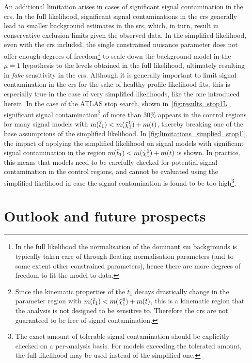 An additional limitation arises in cases of significant signal contamination in the \glspl{cr}. In the full likelihood, significant signal contaminations in the \glspl{cr} generally lead to smaller background estimates in the \glspl{sr}, which, in turn, result in conservative exclusion limits given the observed data.
In the simplified likelihood, even with the \glspl{cr} included, the single constrained nuisance parameter does not offer enough degrees of freedom\footnote{In the full likelihood the normalisation of the dominant \gls{sm} backgrounds is typically taken care of through floating normalisation parameters (and to some extent other constrained parameters), hence there are more degrees of freedom to fit the model to data.} to scale down the background model in the $\mu = 1$ hypothesis to the levels obtained in the full likelihood, ultimately resulting in \textit{fake} sensitivity in the \glspl{cr}.
Although it is generally important to limit signal contamination in the \glspl{cr} for the sake of healthy profile likelihood fits, this is especially true in the case of very simplified likelihoods, like the one introduced herein.
In the case of the ATLAS stop search, shown in~\cref{fig:results_stop1L}, significant signal contamination\footnote{Since the kinematic properties of the $\tilde{t}_1$ decays drastically change in the parameter region with $m(\tilde{t}_1) < m(\tilde{\chi}_1^0)+m(t)$, this is a kinematic region that the analysis is not designed to be sensitive to. Therefore the \glspl{cr} are not guaranteed to be free of signal contamination.} of more than 30\% appears in the control regions for many signal models with $m(\tilde{t}_1) < m(\tilde{\chi}_1^0)+m(t)$, thereby breaking one of the base assumptions of the simplified likelihood.
In \cref{fig:limitations_simplied_stop1l}, the impact of applying the simplified likelihood on signal models with significant signal contamination in the region $m(\tilde{t}_1) < m(\tilde{\chi}_1^0)+m(t)$ is shown. In practice, this means that models need to be carefully checked for potential signal contamination in the control regions, and cannot be evaluated using the simplified likelihood in case the signal contamination is found to be too high\footnote{The exact amount of tolerable signal contamination should be explicitly checked on a per-analysis basis. For models exceeding the tolerated amount, the full likelihood may be used instead of the simplified one.}.

\section{Outlook and future prospects}\label{sec:simplify_outlook}


